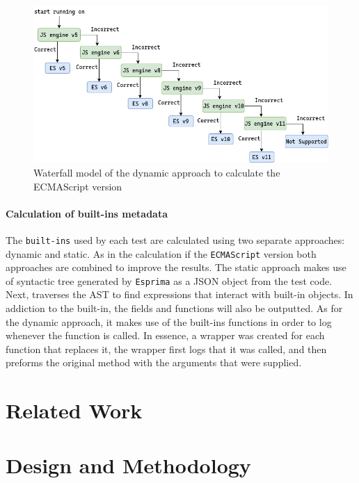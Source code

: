 \documentclass[runningheads]{llncs}
\begin{document}
\begin{figure}[ht]
    \centering
    \includegraphics[width=1\textwidth]{images/waterfall_model.png}
    \caption{Waterfall model of the dynamic approach to calculate the ECMAScript version}
    \label{fig:waterfall_model}
\end{figure}




\paragraph{Calculation of built-ins metadata}
The \texttt{built-ins} used by each test are calculated using two separate approaches: dynamic and static. As in the calculation if the \texttt{ECMAScript} version both approaches are combined to improve the results. The static approach makes use of syntactic tree generated by \texttt{Esprima} as a JSON object from the test code. Next, traverses the AST to find expressions that interact with built-in objects. In addiction to the built-in, the fields and functions will also be outputted. As for the dynamic approach, it makes use of the built-ins functions in order to log whenever the function is called. In essence, a wrapper was created for each function that replaces it, the wrapper first logs that it was called, and then preforms the original method with the arguments that were supplied.




\section{Related Work}
\label{sec:Related Work}



\section{Design and Methodology}
\label{sec:Design and Methodology}
\end{document}
